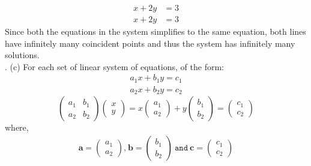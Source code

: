 \documentclass[12pt,letterpaper,fleqn]{article}
\theoremstyle{definition}
\begin{document}
	\begin{equation*}
	\begin{split}
	x + 2y &= 3\\
	x + 2y &= 3
	\end{split}
	\end{equation*}
	Since both the equations in the system simplifies to the same equation, both lines have infinitely many coincident points and thus the system has infinitely many solutions.\\
.
(c) For each set of linear system of equations, of the form:
\begin{equation*}
\begin{split}
a_1x + b_1y = c_1\\
a_2x + b_2y = c_2
\end{split}
\end{equation*}
\begin{equation*}
\begin{pmatrix}
a_1 &b_1\\
a_2 &b_2
\end{pmatrix}
\begin{pmatrix}
x\\
y
\end{pmatrix} = x
\begin{pmatrix}
a_1\\
a_2
\end{pmatrix}
+ y
\begin{pmatrix}
b_1\\
b_2
\end{pmatrix} =
\begin{pmatrix}
c_1\\
c_2
\end{pmatrix}
\end{equation*}
where,
\begin{equation*}
\begin{split}
\textbf{a} = 
\begin{pmatrix}
a_1\\
a_2
\end{pmatrix} \texttt{,}~
\textbf{b} = 
\begin{pmatrix}
b_1\\
b_2
\end{pmatrix}~ \texttt{and}~
\textbf{c} = 
\begin{pmatrix}
c_1\\
c_2
\end{pmatrix}
\end{split}
\end{equation*}
\end{document}
